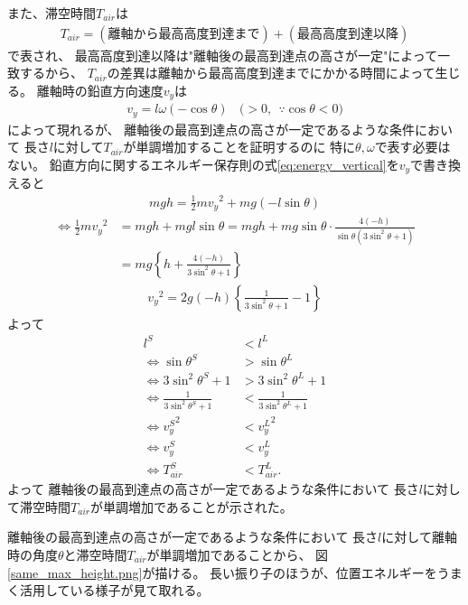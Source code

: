 \documentclass[a4paper,11pt]{jsarticle}
\begin{document}
また、滞空時間$T_{air}$は
\begin{align}
  T_{air} = (\textrm{離軸から最高高度到達まで}) + (\textrm{最高高度到達以降})
\end{align}
で表され、
最高高度到達以降は"離軸後の最高到達点の高さが一定"によって一致するから、
$T_{air}$の差異は離軸から最高高度到達までにかかる時間によって生じる。
離軸時の鉛直方向速度$v_y$は
\begin{align}
  v_y = l\omega (-\cos\theta) \ \ \ \ \Big( > 0, \ \ \because \cos\theta < 0 \Big)
\end{align}
によって現れるが、
離軸後の最高到達点の高さが一定であるような条件において
長さ$l$に対して$T_{air}$が単調増加することを証明するのに
特に$\theta, \omega$で表す必要はない。
鉛直方向に関するエネルギー保存則の式\ref{eq:energy_vertical}を$v_y$で書き換えると
\begin{align}
  mgh = \frac{1}{2}m{v_y}^2 + mg (-l \sin\theta)
\end{align}
\begin{align}
  \Leftrightarrow
  \frac{1}{2}m{v_y}^2
  &= mgh + mgl\sin\theta
  = mgh + mg\sin\theta\cdot\frac{4(-h)}{\sin\theta(3\sin^2\theta + 1)}
  \\
  &= mg\left\{ h + \frac{4(-h)}{3\sin^2\theta + 1} \right\}
\end{align}
\begin{align}
  {v_y}^2 = 2g(-h)\left\{ \frac{1}{3\sin^2\theta + 1} - 1 \right\}
\end{align}
よって
\begin{align}
  l^S &< l^L
  \\
  \Leftrightarrow
  \sin\theta^S &> \sin\theta^L
  \\
  \Leftrightarrow
  3\sin^2\theta^S + 1 &> 3\sin^2\theta^L + 1
  \\
  \Leftrightarrow
  \frac{1}{3\sin^2\theta^S + 1} &< \frac{1}{3\sin^2\theta^L + 1}
  \\
  \Leftrightarrow
  {v_y^S}^2 &< {v_y^L}^2
  \\
  \Leftrightarrow
  v_y^S &< v_y^L
  \\
  \Leftrightarrow
  T_{air}^S &< T_{air}^L.
\end{align}
よって
離軸後の最高到達点の高さが一定であるような条件において
長さ$l$に対して滞空時間$T_{air}$が単調増加であることが示された。

離軸後の最高到達点の高さが一定であるような条件において
長さ$l$に対して離軸時の角度$\theta$と滞空時間$T_{air}$が単調増加であることから、
図\ref{same_max_height.png}が描ける。
長い振り子のほうが、位置エネルギーをうまく活用している様子が見て取れる。
\end{document}
